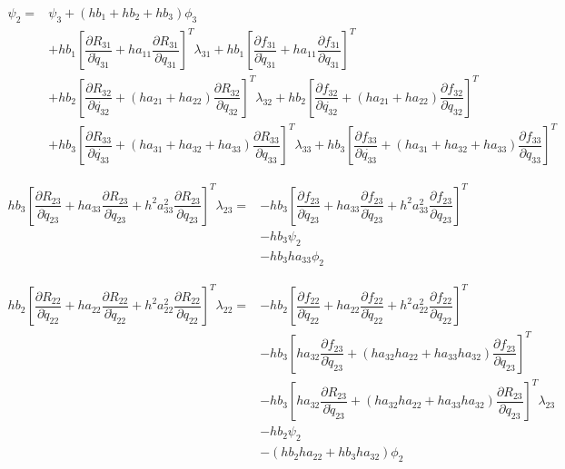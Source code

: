 \documentclass[10pt,letter]{book}
\newcommand{\pd}[2]{\dfrac{\partial #1}{\partial #2}}
\begin{document}
     \begin{equation}
       \begin{split}
          \psi_2 =  & \psi_3 + (hb_1 + hb_2 + hb_3)  \phi_3  \\ 
         & + hb_1 \left[ \pd{R_{31}}{\dot{q}_{31}} + ha_{11} \pd{R_{31}}{q_{31}}  \right]^T \lambda_{31} + hb_1 \left[ \pd{f_{31}}{\dot{q}_{31}} + ha_{11} \pd{f_{31}}{{q}_{31}} \right]^T \\
         & + hb_2 \left[ \pd{R_{32}}{\dot{q_{32}}} + (ha_{21} + ha_{22}) \pd{R_{32}}{q_{32}} \right]^T \lambda_{32} + hb_2 \left[ \pd{f_{32}}{\dot{q_{32}}} + (ha_{21} + ha_{22}) \pd{f_{32}}{q_{32}} \right]^T \\               
         & + hb_3 \left[ \pd{R_{33}}{\dot{q_{33}}} + (ha_{31} + ha_{32} + ha_{33}) \pd{R_{33}}{q_{33}} \right]^T \lambda_{33} + hb_3 \left[ \pd{f_{33}}{\dot{q_{33}}} + (ha_{31} + ha_{32} + ha_{33}) \pd{f_{33}}{q_{33}} \right]^T
       \end{split}
     \end{equation}


     \begin{equation}
       \begin{split}
         hb_3\left[\pd{R_{23}}{\ddot{q}_{23}} + ha_{33}\pd{R_{23}}{\dot{q}_{23}} + h^2a_{33}^2 \pd{R_{23}}{{q}_{23}} \right]^T \lambda_{23} = & - hb_3 \left[\pd{f_{23}}{\ddot{q}_{23}} + ha_{33}\pd{f_{23}}{\dot{q}_{23}} + h^2a_{33}^2 \pd{f_{23}}{{q}_{23}} \right]^T \\ 
         & - hb_3 \psi_2 \\ 
         & - hb_3ha_{33}   \phi_2
       \end{split}
     \end{equation}

     \begin{equation}
       \begin{split}
         hb_2\left[\pd{R_{22}}{\ddot{q}_{22}} + ha_{22}\pd{R_{22}}{\dot{q}_{22}} + h^2a_{22}^2 \pd{R_{22}}{{q}_{22}} \right]^T \lambda_{22} = & - hb_2 \left[\pd{f_{22}}{\ddot{q}_{22}} + ha_{22}\pd{f_{22}}{\dot{q}_{22}} + h^2a_{22}^2 \pd{f_{22}}{{q}_{22}} \right]^T \\ 
         & - hb_3 \left[ha_{32}\pd{f_{23}}{\dot{q}_{23}} + (ha_{32}ha_{22} + ha_{33}ha_{32}) \pd{f_{23}}{{q}_{23}} \right]^T \\  
         & - hb_3 \left[ha_{32}\pd{R_{23}}{\dot{q}_{23}} + (ha_{32}ha_{22} + ha_{33}ha_{32}) \pd{R_{23}}{{q}_{23}} \right]^T\lambda_{23} \\  
         & - hb_2  \psi_2 \\ 
         & - (hb_2ha_{22} + hb_3 ha_{32})   \phi_2
       \end{split}
     \end{equation}
\end{document}

